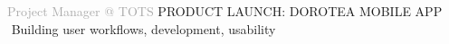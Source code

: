 \begin{cvtable}
{%
}

{\textcolor{darkgray}{Project Manager \newline @ TOTS}}%
{
}%
{%
    {\scriptsize PRODUCT LAUNCH: DOROTEA MOBILE APP} \\
     \textperiodcentered $ $ %
     Building
    user workflows, development,
    usability %
    \\
}
% 

\end{cvtable}
